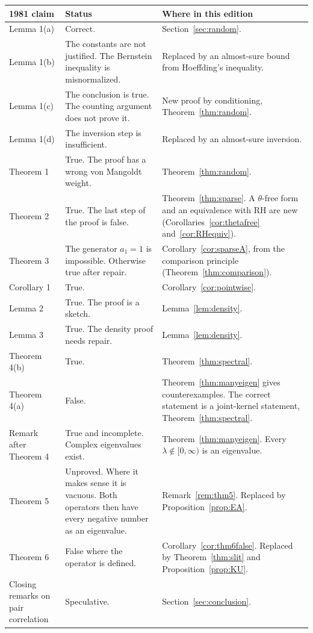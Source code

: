 \documentclass[12pt,letterpaper]{article}
\begin{document}
\begin{longtable}{@{}p{}p{}p{}@{}}
\toprule
\textbf{1981 claim} & \textbf{Status} & \textbf{Where in this edition}\\
\midrule
\endhead
Lemma 1(a) & Correct. & Section~\ref{sec:random}.\\
Lemma 1(b) & The constants are not justified. The Bernstein inequality is
misnormalized. & Replaced by an almost-sure bound from Hoeffding's
inequality.\\
Lemma 1(c) & The conclusion is true. The counting argument does not
prove it. & New proof by conditioning, Theorem~\ref{thm:random}.\\
Lemma 1(d) & The inversion step is insufficient. & Replaced by an
almost-sure inversion.\\
Theorem 1 & True. The proof has a wrong von Mangoldt weight. &
Theorem~\ref{thm:random}.\\
Theorem 2 & True. The last step of the proof is false. &
Theorem~\ref{thm:sparse}. A $\theta$-free form and an equivalence with RH
are new (Corollaries~\ref{cor:thetafree} and~\ref{cor:RHequiv}).\\
Theorem 3 & The generator $a_1=1$ is impossible. Otherwise true after
repair. & Corollary~\ref{cor:sparseA}, from the comparison principle
(Theorem~\ref{thm:comparison}).\\
Corollary 1 & True. & Corollary~\ref{cor:pointwise}.\\
Lemma 2 & True. The proof is a sketch. & Lemma~\ref{lem:density}.\\
Lemma 3 & True. The density proof needs repair. &
Lemma~\ref{lem:density}.\\
Theorem 4(b) & True. & Theorem~\ref{thm:spectral}.\\
Theorem 4(a) & False. & Theorem~\ref{thm:manyeigen} gives
counterexamples. The correct statement is a joint-kernel statement,
Theorem~\ref{thm:spectral}.\\
Remark after Theorem 4 & True and incomplete. Complex eigenvalues
exist. & Theorem~\ref{thm:manyeigen}. Every $\lambda\notin[0,\infty)$ is an
eigenvalue.\\
Theorem 5 & Unproved. Where it makes sense it is vacuous. Both operators
then have every negative number as an eigenvalue. &
Remark~\ref{rem:thm5}. Replaced by Proposition~\ref{prop:EA}.\\
Theorem 6 & False where the operator is defined. &
Corollary~\ref{cor:thm6false}. Replaced by Theorem~\ref{thm:slit} and
Proposition~\ref{prop:KU}.\\
Closing remarks on pair correlation & Speculative. &
Section~\ref{sec:conclusion}.\\
\bottomrule
\end{longtable}
\end{document}
